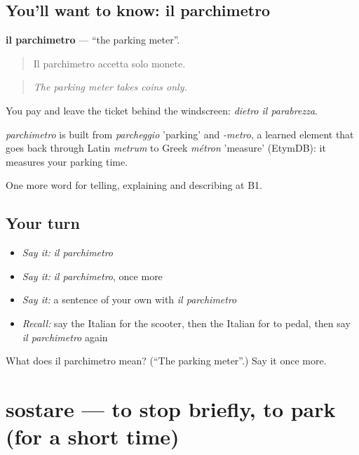 \subsection*{You'll want to know: il parchimetro}
\textbf{il parchimetro} — \textquotedblleft{}the parking meter\textquotedblright{}.

\begin{quote}
Il parchimetro accetta solo monete.
\end{quote}

\begin{quote}
\emph{The parking meter takes coins only.}
\end{quote}

You pay and leave the ticket behind the windscreen: \emph{dietro il parabrezza}.

\begin{cousinweb}
\emph{parchimetro} is built from \emph{parcheggio} 'parking' and \emph{-metro}, a learned element that goes back through Latin \emph{metrum} to Greek \emph{métron} 'measure' (EtymDB): it measures your parking time.
\end{cousinweb}

\begin{grammarlens}[title={What you've built}]
One more word for telling, explaining and describing at B1.
\end{grammarlens}

\subsection*{Your turn}
\begin{itemize}
\raggedright
  \item \emph{Say it:} \emph{il parchimetro}
  \item \emph{Say it:} \emph{il parchimetro}, once more
  \item \emph{Say it:} a sentence of your own with \emph{il parchimetro}
  \item \emph{Recall:} say the Italian for the scooter, then the Italian for to pedal, then say \emph{il parchimetro} again
\end{itemize}

\begin{tcolorbox}[breakable,colback=teal!4,colframe=teal!35!black,title={Before you move on}]
What does il parchimetro mean? (\textquotedblleft{}The parking meter\textquotedblright{}.) Say it once more.
\end{tcolorbox}
\section[sostare]{sostare — to stop briefly, to park (for a short time)}

